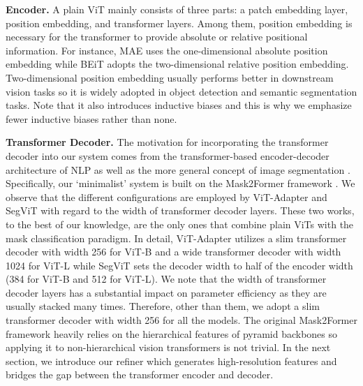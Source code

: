 \documentclass{article} \usepackage{iclr2024_conference,times}
\begin{document}
\textbf{Encoder.} A plain ViT mainly consists of three parts: a patch embedding layer, position embedding, and transformer layers. Among them, position embedding is necessary for the transformer to provide absolute or relative positional information. For instance, MAE \citep{he2022masked} uses the one-dimensional absolute position embedding while BEiT \citep{bao2022beit} adopts the two-dimensional relative position embedding. Two-dimensional position embedding usually performs better in downstream vision tasks so it is widely adopted in object detection and semantic segmentation tasks. Note that it also introduces inductive biases and this is why we emphasize fewer inductive biases rather than none.

\textbf{Transformer Decoder.} The motivation for incorporating the transformer decoder into our system comes from the transformer-based encoder-decoder architecture of NLP \citep{vaswani2017attention} as well as the more general concept of image segmentation \citep{cheng2021per,cheng2022masked}. Specifically, our `minimalist' system is built on the Mask2Former framework \citep{cheng2022masked}. We observe that the different configurations are employed by ViT-Adapter and SegViT with regard to the width of transformer decoder layers. These two works, to the best of our knowledge, are the only ones that combine plain ViTs with the mask classification paradigm. In detail, ViT-Adapter utilizes a slim transformer decoder with width 256 for ViT-B and a wide transformer decoder with width 1024 for ViT-L while SegViT sets the decoder width to half of the encoder width (384 for ViT-B and 512 for ViT-L). We note that the width of transformer decoder layers has a substantial impact on parameter efficiency as they are usually stacked many times. Therefore, other than them, we adopt a slim transformer decoder with width 256 for all the models. The original Mask2Former framework heavily relies on the hierarchical features of pyramid backbones so applying it to non-hierarchical vision transformers is not trivial. In the next section, we introduce our refiner which generates high-resolution features and bridges the gap between the transformer encoder and decoder.
\end{document}
